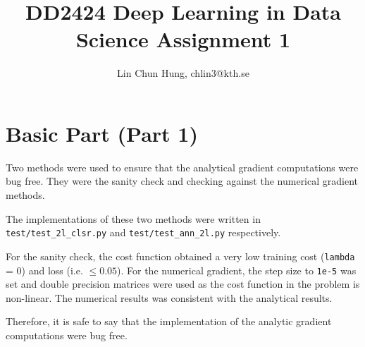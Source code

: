 \documentclass[12pt]{article}
\newenvironment{question}[2][Question]{\begin{trivlist}
\kern10pt
\item[\hskip \labelsep {\bfseries #1}\hskip \labelsep {\bfseries #2.}]}{\end{trivlist}}
\begin{document}
\title{DD2424 Deep Learning in Data Science Assignment 1}
\author{Lin Chun Hung, chlin3@kth.se}

\maketitle

\section{Basic Part (Part 1)}
\begin{question}{i}
Two methods were used to ensure that the analytical gradient computations were bug
free.
They were the sanity check and checking against the numerical gradient methods.

The implementations of these two methods were written in
\texttt{test/test\_2l\_clsr.py} and \texttt{test/test\_ann\_2l.py} respectively.

For the sanity check, the cost function obtained a very low training cost (\texttt{lambda} = 0)
and loss (i.e. $\leq 0.05$).
For the numerical gradient, the step size to \texttt{1e-5} was set and
double precision matrices were used as the cost function in the problem is non-linear.
The numerical results was consistent with the analytical results.

Therefore, it is safe to say that the implementation of the
analytic gradient computations were bug free.
\end{question}
\end{document}
